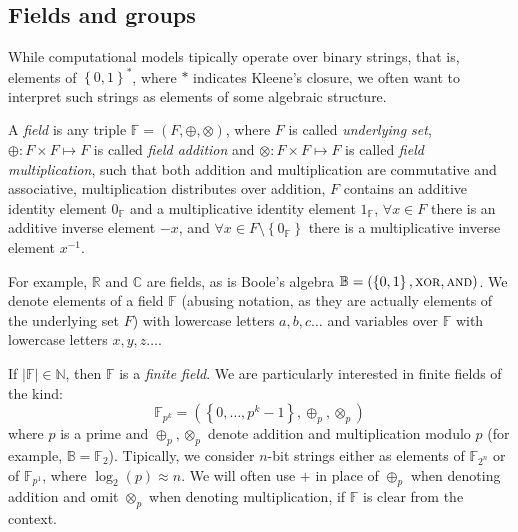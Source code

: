 \subsection{Fields and groups}
While computational models tipically operate over binary strings, that is, elements of
\({\left\{0, 1\right\}}^*\), where \(*\) indicates Kleene's closure, we often want to interpret
such strings as elements of some algebraic structure.
\begin{definition}
	A \emph{field} is any triple \(\mathbb{F} = \left(F, \oplus, \otimes\right)\), where \(F\) is
	called \emph{underlying set}, \(\oplus\colon F \times F \mapsto F\) is called
	\emph{field addition} and \(\otimes\colon F \times F \mapsto F\) is called
	\emph{field multiplication}, such that both addition and multiplication are commutative and
	associative, multiplication distributes over addition, \(F\) contains an additive identity
	element \(0_{\mathbb{F}}\) and a multiplicative identity element \(1_{\mathbb{F}}\),
	\(\forall x \in F\) there is an additive inverse element \(-x\), and
	\(\forall x \in F\setminus \left\{0_{\mathbb{F}}\right\} \) there is a multiplicative inverse
	element \(x^{-1}\).
\end{definition}

\noindent For example, \(\mathbb{R}\) and \(\mathbb{C}\) are fields, as is Boole's algebra
\(\mathbb{B} = \left(\left\{0, 1\right\}, \textsc{xor}, \textsc{and}\right)\).
We denote elements of a field \(\mathbb{F}\) (abusing notation, as they are actually
elements of the underlying set \(F\)) with lowercase letters \(a, b, c\dots \) and variables over
\(\mathbb{F}\) with lowercase letters \(x, y, z\dots \).

If \(\left|\mathbb{F}\right| \in \mathbb{N}\), then \(\mathbb{F}\) is a \emph{finite field}.
We are particularly interested in finite fields of the kind:
\[\mathbb{F}_{p^k} = \left(\left\{0, \dots, p^k-1\right\}, \oplus_p, \otimes_p\right)\]
where \(p\) is a prime and \(\oplus_p, \otimes_p\) denote addition and
multiplication modulo \(p\) (for example, \(\mathbb{B} = \mathbb{F}_2\)).
Tipically, we consider \(n\)-bit strings either as elements of \(\mathbb{F}_{2^n}\) or of
\(\mathbb{F}_{p^1}\), where \(\log_2\left(p\right) \approx n\).
We will often use \(+\) in place of \(\oplus_p \) when denoting addition and omit \(\otimes_p \)
when denoting multiplication, if \(\mathbb{F}\) is clear from the context.


